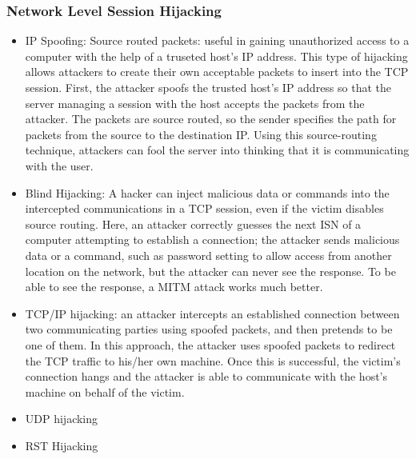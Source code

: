 \subsubsection{Network Level Session Hijacking}
\begin{itemize}
    \item IP Spoofing: Source routed packets: useful in gaining unauthorized access to a computer with the help of a truseted host's IP address. This type of hijacking allows attackers to create their own acceptable packets to insert into the TCP session. First, the attacker spoofs the trusted host's IP address so that the server managing a session with the host accepts the packets from the attacker. The packets are source routed, so the sender specifies the path for packets from the source to the destination IP. Using this source-routing technique, attackers can fool the server into thinking that it is communicating with the user.
    \item Blind Hijacking: A hacker can inject malicious data or commands into the intercepted communications in a TCP session, even if the victim disables source routing. Here, an attacker correctly guesses the next ISN of a computer attempting to establish a connection; the attacker sends malicious data or a command, such as password setting to allow access from another location on the network, but the attacker can never see the response. To be able to see the response, a MITM attack works much better.
    \item TCP/IP hijacking: an attacker intercepts an established connection between two communicating parties using spoofed packets, and then pretends to be one of them. In this approach, the attacker uses spoofed packets to redirect the TCP traffic to his/her own machine. Once this is successful, the victim's connection hangs and the attacker is able to communicate with the host's machine on behalf of the victim.
    \item UDP hijacking
    \item RST Hijacking
\end{itemize}
